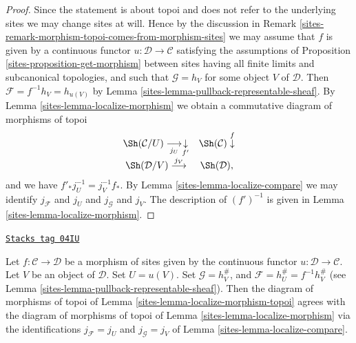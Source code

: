 \begin{proof}

Since the statement is about topoi and does not refer to the underlying
sites we may change sites at will. Hence by the discussion in
Remark \ref{sites-remark-morphism-topoi-comes-from-morphism-sites}
we may assume that $f$ is given by a continuous functor
$u : \mathcal{D} \to \mathcal{C}$ satisfying the assumptions of
Proposition \ref{sites-proposition-get-morphism}
between sites having all finite limits and subcanonical topologies,
and such that $\mathcal{G} = h_V$ for some object $V$ of
$\mathcal{D}$. Then $\mathcal{F} = f^{-1}h_V = h_{u(V)}$ by
Lemma \ref{sites-lemma-pullback-representable-sheaf}.
By
Lemma \ref{sites-lemma-localize-morphism}
we obtain a commutative diagram of morphisms of topoi
$$
\begin{array}{cc}\Sh(\mathcal{C}/U) \underset{j_U}{\longrightarrow}\underset{f'}{\downarrow} & \Sh(\mathcal{C}) \overset{f}{\downarrow} \\ \Sh(\mathcal{D}/V) \overset{j_V}{\longrightarrow} & \Sh(\mathcal{D}),\end{array}
$$
and we have $f'_*j_U^{-1} = j_V^{-1}f_*$. By
Lemma \ref{sites-lemma-localize-compare}
we may identify $j_\mathcal{F}$ and $j_U$
and $j_\mathcal{G}$ and $j_V$. The description of $(f')^{-1}$
is given in
Lemma \ref{sites-lemma-localize-morphism}.
\end{proof}

\begin{lemma}
\label{sites-lemma-localize-morphism-compare}
\href{https://stacks.math.columbia.edu/tag/04IU}{\texttt{Stacks tag 04IU}}

Let $f : \mathcal{C} \to \mathcal{D}$ be a morphism of sites given
by the continuous functor $u : \mathcal{D} \to \mathcal{C}$.
Let $V$ be an object of $\mathcal{D}$. Set $U = u(V)$.
Set $\mathcal{G} = h_V^\#$, and
$\mathcal{F} = h_U^\# = f^{-1}h_V^\#$ (see
Lemma \ref{sites-lemma-pullback-representable-sheaf}).
Then the diagram of morphisms of topoi of
Lemma \ref{sites-lemma-localize-morphism-topoi}
agrees with the diagram of morphisms of topoi of
Lemma \ref{sites-lemma-localize-morphism}
via the identifications $j_\mathcal{F}= j_U$
and $j_\mathcal{G} = j_V$ of
Lemma \ref{sites-lemma-localize-compare}.
\end{lemma}

